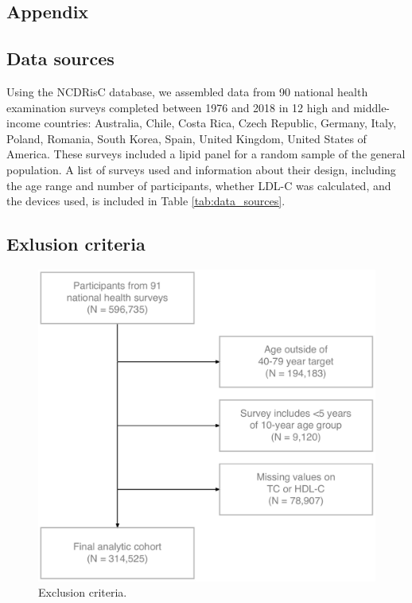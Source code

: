 \documentclass[12pt]{article}
\begin{document}
\begin{appendix}
    \renewcommand{\thefigure}{A\arabic{figure}}
    \setcounter{figure}{0}
    
    \renewcommand{\thetable}{A\arabic{table}}
    \setcounter{table}{0}
    
    \newpage
    
    \section{Appendix} \label{sec:appendixa}
    \renewcommand{\thesection}{\Alph{section}}

    \subsection{Data sources}
    Using the NCDRisC database, we assembled data from 90 national health examination surveys completed between 1976 and 2018 in 12 high and middle-income countries: Australia, Chile, Costa Rica, Czech Republic, Germany, Italy, Poland, Romania, South Korea, Spain, United Kingdom, United States of America. These surveys included a lipid panel for a random sample of the general population. A list of surveys used and information about their design, including the age range and number of participants, whether LDL-C was calculated, and the devices used, is included in Table \ref{tab:data_sources}.
    
    \begin{landscape}
    \begin{singlespace}
        
        \label{tab:data_sources}
    \end{singlespace}
    \end{landscape}

    \subsection{Exlusion criteria}

    \begin{figure}[H]
        \centering
        \includegraphics[width=0.5\linewidth]{../3_figures/figS_STROBE.pdf}
        \caption{Exclusion criteria.}
        \label{fig:exclusion}
    \end{figure}



\end{appendix}
\end{document}

